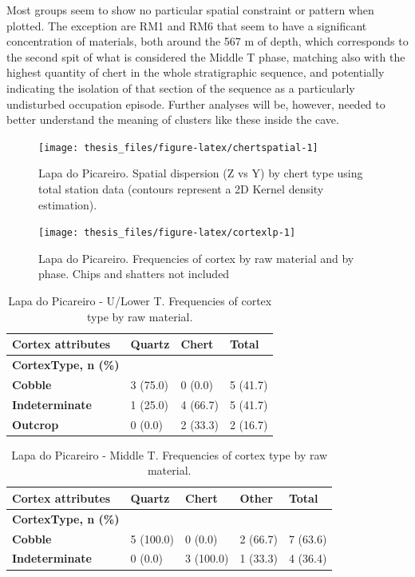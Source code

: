 \documentclass[12pt,twoside]{reedthesis}
\begin{document}
Most groups seem to show no particular spatial constraint or pattern when plotted. The exception are RM1 and RM6 that seem to have a significant concentration of materials, both around the 567 m of depth, which corresponds to the second spit of what is considered the Middle T phase, matching also with the highest quantity of chert in the whole stratigraphic sequence, and potentially indicating the isolation of that section of the sequence as a particularly undisturbed occupation episode. Further analyses will be, however, needed to better understand the meaning of clusters like these inside the cave.
\begin{figure}[H]

{\centering \texttt{[image: thesis\_files/figure-latex/chertspatial-1]} 

}

\caption{Lapa do Picareiro. Spatial dispersion (Z vs Y) by chert type using total station data (contours represent a 2D Kernel density estimation).}\label{fig:chertspatial}
\end{figure}
\begin{figure}[H]

{\centering \texttt{[image: thesis\_files/figure-latex/cortexlp-1]} 

}

\caption{Lapa do Picareiro. Frequencies of cortex by raw material and by phase. Chips and shatters not included}\label{fig:cortexlp}
\end{figure}
\begin{table}[!h]

\caption{\label{tab:cortextabtg}Lapa do Picareiro - U/Lower T. Frequencies of cortex type by raw material.}
\centering
\fontsize{9}{11}\selectfont
\begin{tabular}[t]{>{\bfseries}llll}
\toprule
Cortex attributes & Quartz & Chert & Total\\
\midrule
CortexType, n (\%) &  &  & \\
Cobble & 3 (75.0) & 0 (0.0) & 5 (41.7)\\
Indeterminate & 1 (25.0) & 4 (66.7) & 5 (41.7)\\
Outcrop & 0 (0.0) & 2 (33.3) & 2 (16.7)\\
\bottomrule
\end{tabular}
\end{table}
\begin{table}[!h]

\caption{\label{tab:cortextabpr}Lapa do Picareiro - Middle T. Frequencies of cortex type by raw material.}
\centering
\fontsize{9}{11}\selectfont
\begin{tabular}[t]{>{\bfseries}lllll}
\toprule
Cortex attributes & Quartz & Chert & Other & Total\\
\midrule
CortexType, n (\%) &  &  &  & \\
Cobble & 5 (100.0) & 0 (0.0) & 2 (66.7) & 7 (63.6)\\
Indeterminate & 0 (0.0) & 3 (100.0) & 1 (33.3) & 4 (36.4)\\
\bottomrule
\end{tabular}
\end{table}
\end{document}

